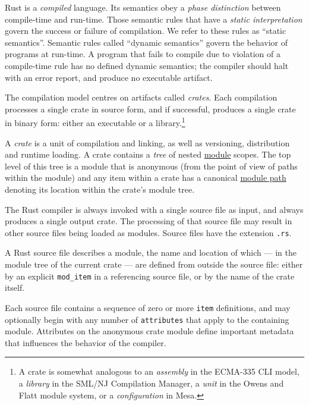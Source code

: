 \documentclass[]{article}
\begin{document}
Rust is a \emph{compiled} language. Its semantics obey a \emph{phase
distinction} between compile-time and run-time. Those semantic rules
that have a \emph{static interpretation} govern the success or failure
of compilation. We refer to these rules as ``static semantics''.
Semantic rules called ``dynamic semantics'' govern the behavior of
programs at run-time. A program that fails to compile due to violation
of a compile-time rule has no defined dynamic semantics; the compiler
should halt with an error report, and produce no executable artifact.

The compilation model centres on artifacts called \emph{crates}. Each
compilation processes a single crate in source form, and if successful,
produces a single crate in binary form: either an executable or a
library.\footnote{A crate is somewhat analogous to an \emph{assembly} in
  the ECMA-335 CLI model, a \emph{library} in the SML/NJ Compilation
  Manager, a \emph{unit} in the Owens and Flatt module system, or a
  \emph{configuration} in Mesa.}

A \emph{crate} is a unit of compilation and linking, as well as
versioning, distribution and runtime loading. A crate contains a
\emph{tree} of nested \hyperref[modules]{module} scopes. The top level
of this tree is a module that is anonymous (from the point of view of
paths within the module) and any item within a crate has a canonical
\hyperref[paths]{module path} denoting its location within the crate's
module tree.

The Rust compiler is always invoked with a single source file as input,
and always produces a single output crate. The processing of that source
file may result in other source files being loaded as modules. Source
files have the extension \texttt{.rs}.

A Rust source file describes a module, the name and location of which
--- in the module tree of the current crate --- are defined from outside
the source file: either by an explicit \texttt{mod\_item} in a
referencing source file, or by the name of the crate itself.

Each source file contains a sequence of zero or more \texttt{item}
definitions, and may optionally begin with any number of
\texttt{attributes} that apply to the containing module. Attributes on
the anonymous crate module define important metadata that influences the
behavior of the compiler.
\end{document}
